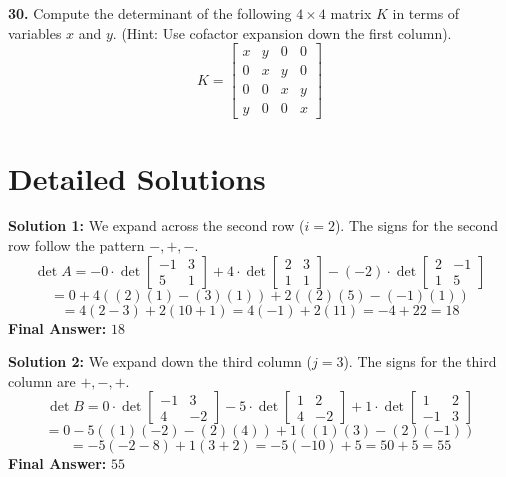 \documentclass[11pt]{article}
\begin{document}
\textbf{30.} Compute the determinant of the following $4 \times 4$ matrix $K$ in terms of variables $x$ and $y$. (Hint: Use cofactor expansion down the first column).
$$K = \begin{bmatrix} x & y & 0 & 0 \\ 0 & x & y & 0 \\ 0 & 0 & x & y \\ y & 0 & 0 & x \end{bmatrix}$$

\newpage

\section{Detailed Solutions}

\textbf{Solution 1:}
We expand across the second row ($i=2$). The signs for the second row follow the pattern $-, +, -$.
$$\det A = -0 \cdot \det \begin{bmatrix} -1 & 3 \\ 5 & 1 \end{bmatrix} + 4 \cdot \det \begin{bmatrix} 2 & 3 \\ 1 & 1 \end{bmatrix} - (-2) \cdot \det \begin{bmatrix} 2 & -1 \\ 1 & 5 \end{bmatrix}$$
$$= 0 + 4((2)(1) - (3)(1)) + 2((2)(5) - (-1)(1))$$
$$= 4(2 - 3) + 2(10 + 1) = 4(-1) + 2(11) = -4 + 22 = 18$$
\textbf{Final Answer:} $18$

\vspace{0.5cm}
\textbf{Solution 2:}
We expand down the third column ($j=3$). The signs for the third column are $+, -, +$.
$$\det B = 0 \cdot \det \begin{bmatrix} -1 & 3 \\ 4 & -2 \end{bmatrix} - 5 \cdot \det \begin{bmatrix} 1 & 2 \\ 4 & -2 \end{bmatrix} + 1 \cdot \det \begin{bmatrix} 1 & 2 \\ -1 & 3 \end{bmatrix}$$
$$= 0 - 5((1)(-2) - (2)(4)) + 1((1)(3) - (2)(-1))$$
$$= -5(-2 - 8) + 1(3 + 2) = -5(-10) + 5 = 50 + 5 = 55$$
\textbf{Final Answer:} $55$
\end{document}
